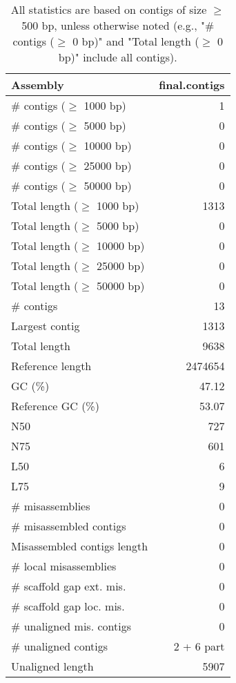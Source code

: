 \documentclass[12pt,a4paper]{article}
\begin{document}
\begin{table}[ht]
\begin{center}
\caption{All statistics are based on contigs of size $\geq$ 500 bp, unless otherwise noted (e.g., "\# contigs ($\geq$ 0 bp)" and "Total length ($\geq$ 0 bp)" include all contigs).}
\begin{tabular}{|l*{1}{|r}|}
\hline
Assembly & final.contigs \\ \hline
\# contigs ($\geq$ 1000 bp) & 1 \\ \hline
\# contigs ($\geq$ 5000 bp) & 0 \\ \hline
\# contigs ($\geq$ 10000 bp) & 0 \\ \hline
\# contigs ($\geq$ 25000 bp) & 0 \\ \hline
\# contigs ($\geq$ 50000 bp) & 0 \\ \hline
Total length ($\geq$ 1000 bp) & 1313 \\ \hline
Total length ($\geq$ 5000 bp) & 0 \\ \hline
Total length ($\geq$ 10000 bp) & 0 \\ \hline
Total length ($\geq$ 25000 bp) & 0 \\ \hline
Total length ($\geq$ 50000 bp) & 0 \\ \hline
\# contigs & 13 \\ \hline
Largest contig & 1313 \\ \hline
Total length & 9638 \\ \hline
Reference length & 2474654 \\ \hline
GC (\%) & 47.12 \\ \hline
Reference GC (\%) & 53.07 \\ \hline
N50 & 727 \\ \hline
N75 & 601 \\ \hline
L50 & 6 \\ \hline
L75 & 9 \\ \hline
\# misassemblies & 0 \\ \hline
\# misassembled contigs & 0 \\ \hline
Misassembled contigs length & 0 \\ \hline
\# local misassemblies & 0 \\ \hline
\# scaffold gap ext. mis. & 0 \\ \hline
\# scaffold gap loc. mis. & 0 \\ \hline
\# unaligned mis. contigs & 0 \\ \hline
\# unaligned contigs & 2 + 6 part \\ \hline
Unaligned length & 5907 \\ \hline

\end{tabular}
\end{center}
\end{table}
\end{document}
